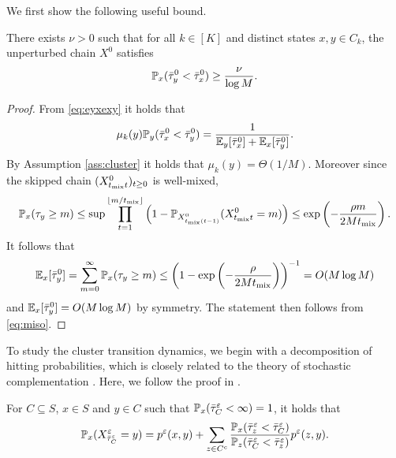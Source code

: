 We first show the following useful bound.
\begin{lemma}\label{thm:nu}
There exists $\nu>0$ such that for all $k\in[K]$ and distinct states $x,y\in C_k$, the unperturbed chain $X^0$ satisfies
\begin{equation*}
\mathbb{P}_x(\bar{\tau}_y^0<\bar{\tau}_x^0) \ge\frac{\nu}{\log M}.
\end{equation*}
\end{lemma}

\begin{proof}
From \eqref{eq:eyxexy} it holds that
\begin{equation}\label{eq:miso}
\mu_k(y)\mathbb{P}_y(\bar{\tau}_x^0<\bar{\tau}_y^0) = \frac{1}{\mathbb{E}_{y}[\bar{\tau}_x^0] + \mathbb{E}_{x}[\bar{\tau}_y^0]}.
\end{equation}
By Assumption \ref{ass:cluster} it holds that $\mu_k(y)=\Theta(1/M)$. Moreover since the skipped chain $(X_{t_{\operatorname{mix}}t}^0)_{t\ge 0}$ is well-mixed,
\begin{align*}
\mathbb{P}_x(\tau_y\ge m) \le \sup\prod_{t=1}^{\lfloor m/t_{\operatorname{mix}}\rfloor} \left(1-\mathbb{P}_{X_{t_{\operatorname{mix}}(t-1)}^0} (X_{t_{\operatorname{mix}}t}^0 = m)\right) \le \exp\left(-\frac{\rho m}{2Mt_{\operatorname{mix}}} \right).
\end{align*}
It follows that
\begin{align*}
\mathbb{E}_{x}[\bar{\tau}_y^0] = \sum_{m=0}^\infty \mathbb{P}_x(\tau_y\ge m) \le \left(1-  \exp\left(-\frac{\rho}{2Mt_{\operatorname{mix}}} \right)\right)^{-1} = O(M\log M)
\end{align*}
and $\mathbb{E}_{x}[\bar{\tau}_y^0]= O(M\log M)$ by symmetry. The statement then follows from \eqref{eq:miso}.
\end{proof}

To study the cluster transition dynamics, we begin with a decomposition of hitting probabilities, which is closely related to the theory of stochastic complementation \citep{Meyer89}. Here, we follow the proof in \citet{Betz16}.
\begin{lemma}\label{thm:decomp}
For $C\subseteq S$, $x\in S$ and $y\in C$ such that $\mathbb{P}_x(\bar{\tau}_C^\varepsilon<\infty) = 1$, it holds that
\begin{equation}\label{eq:decomp}
\mathbb{P}_x(X_{\bar{\tau}_C^\varepsilon}^\varepsilon=y) = p^\varepsilon(x,y) +\sum_{z\in C^c} \frac{\mathbb{P}_x(\bar{\tau}_z^\varepsilon<\bar{\tau}_C^\varepsilon)}{\mathbb{P}_z(\bar{\tau}_C^\varepsilon<\bar{\tau}_z^\varepsilon)} p^\varepsilon(z,y).
\end{equation}
\end{lemma}


